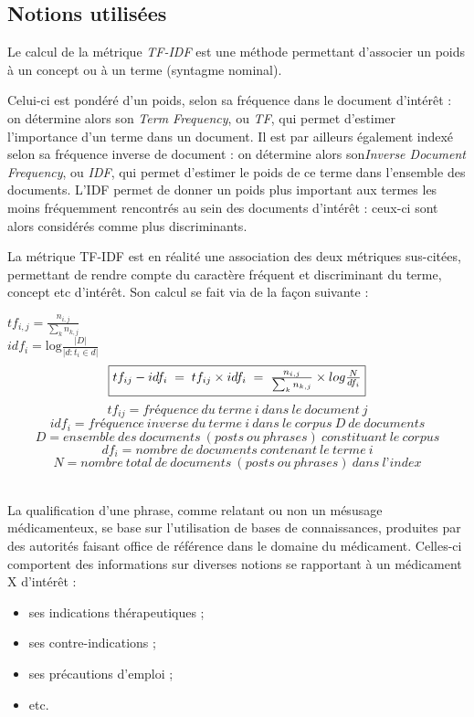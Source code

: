 \documentclass[a4paper, 12pt, openany, oneside, abstract=on]{article} %
\begin{document}
\subsection{Notions utilisées}
\label{TFIDF}
Le calcul de la métrique \emph{TF-IDF} est une méthode permettant d’associer un poids à un concept ou à un terme (syntagme nominal).

Celui-ci est pondéré d'un poids, selon sa fréquence dans le document d'intérêt : on détermine alors son \emph{Term Frequency}, ou \emph{TF}, qui permet d'estimer l'importance d'un terme dans un document. Il est par ailleurs également indexé selon sa fréquence inverse de document : on détermine alors son\emph{Inverse Document Frequency}, ou \emph{IDF}, qui permet d'estimer le poids de ce terme dans l'ensemble des documents. L’IDF permet de donner un poids plus important aux termes les moins fréquemment rencontrés au sein des documents d'intérêt : ceux-ci sont alors considérés comme plus discriminants.

La métrique TF-IDF est en réalité une association des deux métriques sus-citées, permettant de rendre compte du caractère fréquent et discriminant du terme, concept etc d'intérêt. Son calcul se fait via de la façon suivante :\vspace{0.5cm}

 \begin{minipage}{\textwidth}
 \centering
 $tf_{i,j} = \frac{n_{i,j}}{\sum_k n_{k,j}}$\\
 $idf_i = \mbox{log} \frac{|D|}{|{d : t_i \in d}|}$\\
 \[\fbox{$tf_{ij}-idf_{i} \; = \; tf_{ij} \times idf_{i} \; = \; \frac{n_{i,j}}{\sum_k n_{k,j}} \times log\frac{N}{df_i}$}\]
 \footnotesize
    \[tf_{ij} = fréquence\ du\ terme\ i\ dans\ le\ document\ j\]
    \[idf_i = fréquence\ inverse\ du\ terme\ i\ dans\ le\ corpus\ D\ de\ documents\]
    \[D = ensemble\ des\ documents\ (posts\ ou\ phrases)\ constituant\ le\ corpus\]
    \[df_{i} = nombre\ de\ documents\ contenant\ le\ terme\ i\]
    \[N = nombre\ total\ de\ documents\ (posts\ ou\ phrases)\ dans\ l’index\]\\
  \normalsize
\end{minipage}
\vspace{0.5cm}

La qualification d'une phrase, comme relatant ou non un mésusage médicamenteux, se base sur l'utilisation de bases de connaissances, produites par des autorités faisant office de référence dans le domaine du médicament. Celles-ci comportent des informations sur diverses notions se rapportant à un médicament X d'intérêt :
\begin{itemize}
    \item ses indications thérapeutiques ;
    \item ses contre-indications ;
    \item ses précautions d'emploi ;
    \item etc.
\end{itemize}
\end{document}
